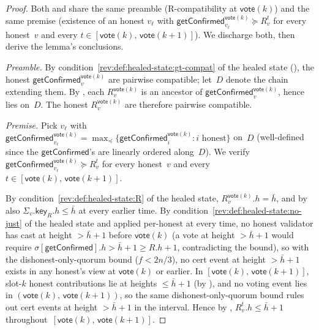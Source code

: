 \documentclass{article}
\newcommand{\key}{\mathsf{key}}
\newcommand{\vote}{\mathsf{vote}}
\newcommand{\comm}[1]{\bar{#1}}
\newcommand{\getConfirmed}{\textsf{getConfirmed}\xspace}
\theoremstyle{plain}
\theoremstyle{definition}
\theoremstyle{remark}
\begin{document}
\begin{proof}
Both  and  share the same preamble (R-compatibility at $\vote(k)$) and the same premise (existence of an honest $v_\ell$ with $\getConfirmed_{v_\ell}^{\vote(k)} \succeq R_v^t$ for every honest~$v$ and every $t \in [\vote(k),\, \vote(k+1)]$). We discharge both, then derive the lemma's conclusions.

\emph{Preamble.}
By condition~\ref{rev:def:healed-state:gt-compat} of the healed state (), the honest $\getConfirmed_v^{\vote(k)}$ are pairwise compatible; let~$D$ denote the chain extending them. By , each $R_v^{\vote(k)}$ is an ancestor of $\getConfirmed_v^{\vote(k)}$, hence lies on~$D$. The honest $R_v^{\vote(k)}$ are therefore pairwise compatible.

\emph{Premise.}
Pick $v_\ell$ with $\getConfirmed_{v_\ell}^{\vote(k)} = \max_\preceq \{\getConfirmed_i^{\vote(k)} : i \text{ honest}\}$ on~$D$ (well-defined since the $\getConfirmed$'s are linearly ordered along~$D$). We verify $\getConfirmed_{v_\ell}^{\vote(k)} \succeq R_v^t$ for every honest~$v$ and every $t \in [\vote(k),\, \vote(k+1)]$.

By condition~\ref{rev:def:healed-state:R} of the healed state, $R_v^{\vote(k)}.h = \comm{h}$, and by  also $\Sigma_v.\key_R.h \leq \comm{h}$ at every earlier time. By condition~\ref{rev:def:healed-state:no-just} of the healed state and  applied per-honest at every time, no honest validator has cast at height $> \comm{h}+1$ before $\vote(k)$ (a vote at height $> \comm{h}+1$ would require $\sigma[\getConfirmed].h > \comm{h}+1 \geq R.h + 1$, contradicting the bound), so with the dishonest-only-quorum bound ($f < 2n/3$), no cert event at height $> \comm{h}+1$ exists in any honest's view at $\vote(k)$ or earlier. In $[\vote(k),\, \vote(k+1)]$, slot-$k$ honest contributions lie at heights $\leq \comm{h}+1$ (by ), and no voting event lies in $(\vote(k),\, \vote(k+1))$, so the same dishonest-only-quorum bound rules out cert events at height $> \comm{h}+1$ in the interval. Hence by , $R_v^t.h \leq \comm{h}+1$ throughout~$[\vote(k),\, \vote(k+1)]$.


\end{proof}
\end{document}
